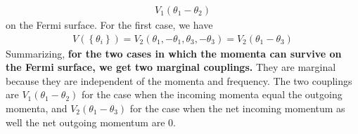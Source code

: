 \documentclass[14pt]{extarticle}
\begin{document}
\begin{equation}\begin{aligned}
V_1(\theta_1 - \theta_2)
\end{aligned}\end{equation}
on the Fermi surface. For the first case, we have 
\begin{equation}\begin{aligned}
	V(\left\{\theta_i\right\}) = V_2(\theta_1,-\theta_1,\theta_3,-\theta_3) = V_2(\theta_1 - \theta_3)
\end{aligned}\end{equation}
Summarizing, \textbf{for the two cases in which the momenta can survive on the Fermi surface, we get two marginal couplings.} They are marginal because they are independent of the momenta and frequency. The two couplings are \(V_1(\theta_1 - \theta_2)\) for the case when the incoming momenta equal the outgoing momenta, and \(V_2(\theta_1 - \theta_3)\) for the case when the net incoming momentum as well the net outgoing momentum are 0.
\end{document}
